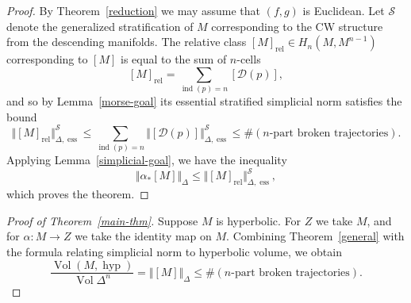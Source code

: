 \documentclass[psamsfonts]{amsart}
\theoremstyle{remark}
\DeclareMathOperator{\Vol}{Vol}
\DeclareMathOperator{\ind}{ind}
\DeclareMathOperator{\hyp}{hyp}
\DeclareMathOperator{\ess}{ess}
\DeclareMathOperator{\rel}{rel}
\begin{document}
\begin{proof}
By Theorem~\ref{reduction} we may assume that $(f, g)$ is Euclidean.  Let $\mathcal{S}$ denote the generalized stratification of $M$ corresponding to the CW structure from the descending manifolds.  The relative class $[M]_{\rel} \in H_n(M, M^{n-1})$ corresponding to $[M]$ is equal to the sum of $n$-cells
\[[M]_{\rel} = \sum_{\ind(p) = n} [\mathcal{D}(p)],\]
and so by Lemma~\ref{morse-goal} its essential stratified simplicial norm satisfies the bound
\[\Vert [M]_{\rel} \Vert_{\Delta, \ess}^{\mathcal{S}} \leq \sum_{\ind(p) = n} \Vert [\mathcal{D}(p)] \Vert_{\Delta, \ess}^{\mathcal{S}} \leq \#(n\text{-part broken trajectories}).\]
Applying Lemma~\ref{simplicial-goal}, we have the inequality
\[\Vert \alpha_*[M]\Vert_\Delta \leq \Vert [M]_{\rel} \Vert_{\Delta, \ess}^{\mathcal{S}},\]
which proves the theorem.
\end{proof}

\begin{proof}[Proof of Theorem~\ref{main-thm}]
Suppose $M$ is hyperbolic.  For $Z$ we take $M$, and for $\alpha : M \rightarrow Z$ we take the identity map on $M$.  Combining Theorem~\ref{general} with the formula relating simplicial norm to hyperbolic volume, we obtain
\[\frac{\Vol(M, \hyp)}{\Vol \Delta^n} = \Vert [M] \Vert_{\Delta} \leq \#(n\text{-part broken trajectories}).\]
\end{proof}

{}

\end{document}
